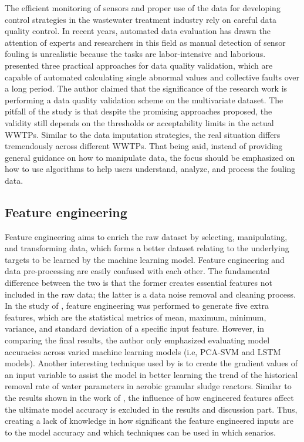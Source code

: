 The efficient monitoring of sensors and proper use of the data for developing control strategies in the wastewater treatment industry rely on careful data quality control. In recent years, automated data evaluation has drawn the attention of experts and researchers in this field as manual detection of sensor fouling is unrealistic because the tasks are labor-intensive and laborious. \citet{alferesValidatingDataQuality2013} presented three practical approaches for data quality validation, which are capable of automated calculating single abnormal values and collective faults over a long period. The author claimed that the significance of the research work is performing a data quality validation scheme on the multivariate dataset. The pitfall of the study is that despite the promising approaches proposed, the validity still depends on the thresholds or acceptability limits in the actual WWTPs. Similar to the data imputation strategies, the real situation differs tremendously across different WWTPs. That being said, instead of providing general guidance on how to manipulate data, the focus should be emphasized on how to use algorithms to help users understand, analyze, and process the fouling data.

\subsection{Feature engineering}
Feature engineering aims to enrich the raw dataset by selecting, manipulating, and transforming data, which forms a better dataset relating to the underlying targets to be learned by the machine learning model. Feature engineering and data pre-processing are easily confused with each other. The fundamental difference between the two is that the former creates essential features not included in the raw data; the latter is a data noise removal and cleaning process. In the study of \citet{mamandipoorMonitoringDetectingFaults2020}, feature engineering was performed to generate five extra features, which are the statistical metrics of mean, maximum, minimum, variance, and standard deviation of a specific input feature. However, in comparing the final results, the author only emphasized evaluating model accuracies across varied machine learning models (i.e, PCA-SVM and LSTM models). Another interesting technique used by \citet{zaghloulDevelopmentEnsembleMachine2021} is to create the gradient values of an input variable to assist the model in better learning the trend of the historical removal rate of water parameters in aerobic granular sludge reactors. Similar to the results shown in the work of \citet{mamandipoorMonitoringDetectingFaults2020}, the influence of how engineered features affect the ultimate model accuracy is excluded in the results and discussion part. Thus, creating a lack of knowledge in how significant the feature engineered inputs are to the model accuracy and which techniques can be used in which senarios. 

